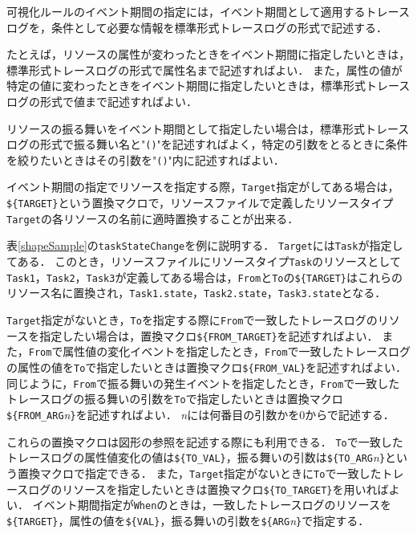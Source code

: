 \begin{description}
{\begin{description}
    \end{description}
}
\end{description}

可視化ルールのイベント期間の指定には，イベント期間として適用するトレースログを，条件として必要な情報を標準形式トレースログの形式で記述する．

たとえば，リソースの属性が変わったときをイベント期間に指定したいときは，標準形式トレースログの形式で属性名まで記述すればよい．
また，属性の値が特定の値に変わったときをイベント期間に指定したいときは，標準形式トレースログの形式で値まで記述すればよい．

リソースの振る舞いをイベント期間として指定したい場合は，標準形式トレースログの形式で振る舞い名と"{\tt ()}"を記述すればよく，特定の引数をとるときに条件を絞りたいときはその引数を"{\tt ()}"内に記述すればよい．

イベント期間の指定でリソースを指定する際，{\tt Target}指定がしてある場合は，\verb|${TARGET}|という置換マクロで，リソースファイルで定義したリソースタイプ{\tt Target}の各リソースの名前に適時置換することが出来る．

表\ref{shapeSample}の{\tt taskStateChange}を例に説明する．
{\tt Target}には{\tt Task}が指定してある．
このとき，リソースファイルにリソースタイプ{\tt Task}のリソースとして{\tt Task1}，{\tt Task2}，{\tt Task3}が定義してある場合は，{\tt From}と{\tt To}の\verb|${TARGET}|はこれらのリソース名に置換され，{\tt Task1.state}，{\tt Task2.state}，{\tt Task3.state}となる．

{\tt Target}指定がないとき，{\tt To}を指定する際に{\tt From}で一致したトレースログのリソースを指定したい場合は，置換マクロ\verb|${FROM_TARGET}|を記述すればよい．
また，{\tt From}で属性値の変化イベントを指定したとき，{\tt From}で一致したトレースログの属性の値を{\tt To}で指定したいときは置換マクロ\verb|${FROM_VAL}|を記述すればよい．
同じように，{\tt From}で振る舞いの発生イベントを指定したとき，{\tt From}で一致したトレースログの振る舞いの引数を{\tt To}で指定したいときは置換マクロ\verb|${FROM_ARG|{\it n}\verb|}|を記述すればよい．
{\it n}には何番目の引数かを0からで記述する．

これらの置換マクロは図形の参照を記述する際にも利用できる．
{\tt To}で一致したトレースログの属性値変化の値は\verb|${TO_VAL}|，振る舞いの引数は\verb|${TO_ARG|{\it n}\verb|}|という置換マクロで指定できる．
また，{\tt Target}指定がないときに{\tt To}で一致したトレースログのリソースを指定したいときは置換マクロ\verb|${TO_TARGET}|を用いればよい．
イベント期間指定が{\tt When}のときは，一致したトレースログのリソースを\verb|${TARGET}|，属性の値を\verb|${VAL}|，振る舞いの引数を\verb|${ARG|{\it n}\verb|}|で指定する．


